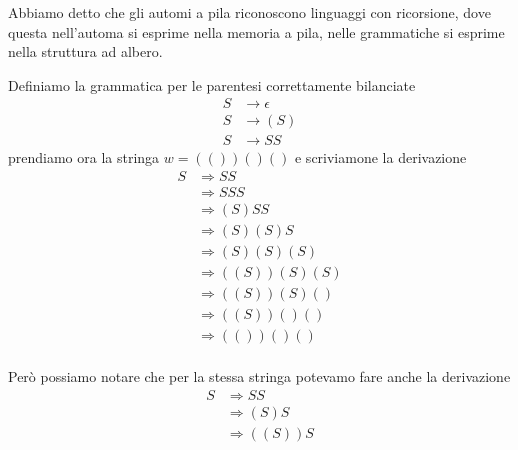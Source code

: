 \documentclass[12pt]{article}
\begin{document}
Abbiamo detto che gli automi a pila riconoscono linguaggi con ricorsione, dove questa nell'automa si esprime nella memoria a pila, nelle grammatiche si esprime nella struttura ad albero.

\begin{tcolorbox}
	Definiamo la grammatica per le parentesi correttamente bilanciate
	\begin{align*}
		S &\rightarrow \epsilon \\
		S &\rightarrow ( S ) \\
		S &\rightarrow S S
	\end{align*}
	prendiamo ora la stringa $w = (())()()$ e scriviamone la derivazione
	\begin{align*}
		S &\Rightarrow S S  \\
		  &\Rightarrow S S S  \\
		  &\Rightarrow ( S ) S S  \\
		  &\Rightarrow ( S ) ( S ) S  \\
		  &\Rightarrow ( S ) ( S ) ( S )  \\
		  &\Rightarrow ( ( S ) ) ( S ) ( S )  \\
		  &\Rightarrow ( ( S ) ) ( S ) ( )  \\
		  &\Rightarrow ( ( S ) ) ( ) ( )  \\
		  &\Rightarrow ( ( ) ) ( ) ( )  \\
	\end{align*}
	\begin{center}
	\end{center}
	Però possiamo notare che per la stessa stringa potevamo fare anche la derivazione
	\begin{align*}
		S &\Rightarrow S S  \\
		  &\Rightarrow ( S ) S  \\
		  &\Rightarrow ( ( S ) ) S  \\

\end{align*}
\end{tcolorbox}
\end{document}
